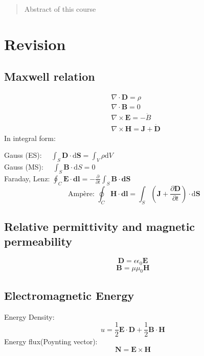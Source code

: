 \documentclass[12pt,a4paper]{article}
\begin{document}
\begin{titlepage}
    \maketitle
\end{titlepage}

\tableofcontents

\newpage

\begin{abstract}
\noindent
Abstract of this course
\end{abstract}

\section{Revision}
\subsection{Maxwell relation}
$$
\begin{aligned}
& \nabla \cdot \boldsymbol{D}=\rho \\
& \nabla \cdot \boldsymbol{B}=0 \\
& \nabla \times \boldsymbol{E}=-\dot{B} \\
& \nabla \times \boldsymbol{H}=\boldsymbol{J}+\dot{\boldsymbol{D}}
\end{aligned}
$$
In integral form:
\begin{center}
Gauss (ES): $\quad \int_S \boldsymbol{D} \cdot \mathrm{d} \boldsymbol{S}=\int_V \rho \mathrm{d} V$\\
Gauss (MS): $\quad \int_S \boldsymbol{B} \cdot \mathrm{d} S=0$\\
Faraday, Lenz: $\oint_C \boldsymbol{E} \cdot \mathbf{d} \boldsymbol{l}=-\frac{\partial}{\partial t} \int_S \boldsymbol{B} \cdot \mathbf{d} \boldsymbol{S}$\\
$$
\text { Ampère: } \oint_C \boldsymbol{H} \cdot \mathbf{d} \boldsymbol{l}=\int_S\left(\boldsymbol{J}+\frac{\partial \boldsymbol{D}}{\partial t}\right) \cdot \mathrm{d} \boldsymbol{S}
$$
\end{center}
\subsection{Relative permittivity and magnetic permeability}
$$
\boldsymbol{D}=\epsilon \epsilon_0 \boldsymbol{E}
$$
$$ 
\boldsymbol{B}=\mu \mu_0 \boldsymbol{H}
$$
\subsection{Electromagnetic Energy}
Energy Density:
$$
u=\frac{1}{2} \boldsymbol{E} \cdot \boldsymbol{D}+\frac{1}{2} \boldsymbol{B} \cdot \boldsymbol{H}
$$
Energy flux(Poynting vector):
$$
\boldsymbol{N}=\boldsymbol{E} \times \boldsymbol{H}
$$
\end{document}
